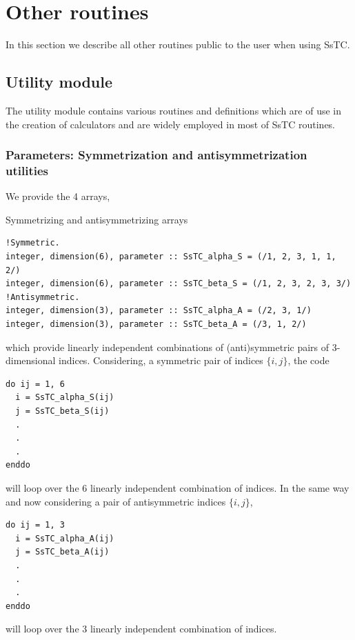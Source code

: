 \documentclass[10pt,a4paper]{article}
\begin{document}
\section{Other routines}
In this section we describe all other routines public to the user when using SsTC.
\subsection{Utility module}
The utility module contains various routines and definitions which are of use in the creation of calculators and are widely employed in most of SsTC routines.
\subsubsection{Parameters: Symmetrization and antisymmetrization utilities}
We provide the 4 arrays,
\begin{codebox}{Symmetrizing and antisymmetrizing arrays}
\begin{lstlisting}[caption={Symmetrization and antisymmetrization arrays.},captionpos=b]
!Symmetric.
integer, dimension(6), parameter :: SsTC_alpha_S = (/1, 2, 3, 1, 1, 2/)
integer, dimension(6), parameter :: SsTC_beta_S = (/1, 2, 3, 2, 3, 3/)
!Antisymmetric.
integer, dimension(3), parameter :: SsTC_alpha_A = (/2, 3, 1/)
integer, dimension(3), parameter :: SsTC_beta_A = (/3, 1, 2/)
\end{lstlisting}
\end{codebox}
which provide linearly independent combinations of (anti)symmetric pairs of 3-dimensional indices. Considering, a symmetric pair of indices $\{i, j\}$, the code
\begin{codebox}{}
\begin{lstlisting}[caption={Loop over symmetric pair of indices.},captionpos=b]
do ij = 1, 6
  i = SsTC_alpha_S(ij)
  j = SsTC_beta_S(ij)
  .
  .
  .
enddo
\end{lstlisting}
\end{codebox}
will loop over the 6 linearly independent combination of indices. In the same way and now considering a pair of antisymmetric indices $\{i, j\}$,
\begin{codebox}{}
\begin{lstlisting}[caption={Loop over antisymmetric pair of indices.},captionpos=b]
do ij = 1, 3
  i = SsTC_alpha_A(ij)
  j = SsTC_beta_A(ij)
  .
  .
  .
enddo
\end{lstlisting}
\end{codebox}
will loop over the 3 linearly independent combination of indices.
\end{document}
